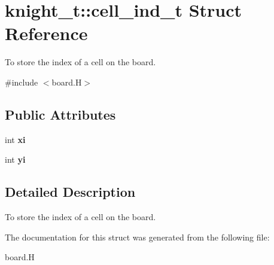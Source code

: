 \hypertarget{structknight__t_1_1cell__ind__t}{\section{knight\-\_\-t\-:\-:cell\-\_\-ind\-\_\-t \-Struct \-Reference}
\label{structknight__t_1_1cell__ind__t}
}


\-To store the index of a cell on the board.  




{\ttfamily \#include $<$board.\-H$>$}

\subsection*{\-Public \-Attributes}
\begin{DoxyCompactItemize}
\item 
\hypertarget{structknight__t_1_1cell__ind__t_ae9597987f7a19fccf95c75ce465110cc}{int {\bfseries xi}}\label{structknight__t_1_1cell__ind__t_ae9597987f7a19fccf95c75ce465110cc}

\item 
\hypertarget{structknight__t_1_1cell__ind__t_a75889d51b063e8a0666d29a532c78ddb}{int {\bfseries yi}}\label{structknight__t_1_1cell__ind__t_a75889d51b063e8a0666d29a532c78ddb}

\end{DoxyCompactItemize}


\subsection{\-Detailed \-Description}
\-To store the index of a cell on the board. 

\-The documentation for this struct was generated from the following file\-:\begin{DoxyCompactItemize}
\item 
board.\-H\end{DoxyCompactItemize}
